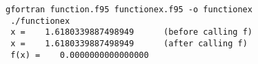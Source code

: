 \begin{Verbatim}[frame=lines,label=functionex - commands and output]
 gfortran function.f95 functionex.f95 -o functionex
 ./functionex
 x =    1.6180339887498949      (before calling f)
 x =    1.6180339887498949      (after calling f)
 f(x) =    0.0000000000000000     
\end{Verbatim}
